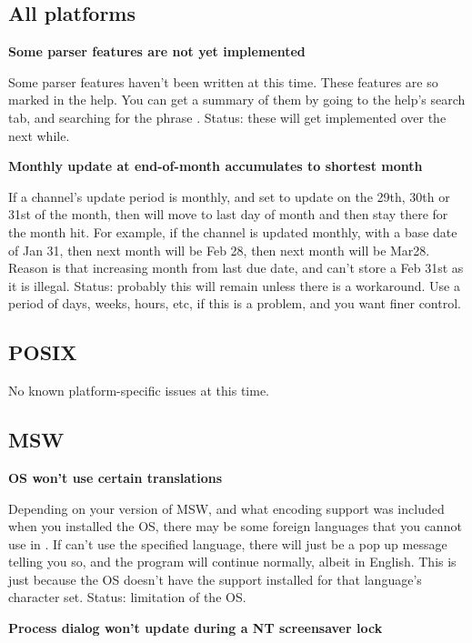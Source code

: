 \begin{helponly}
\subsection{All platforms}\label{pd-known-issues-all-platforms}

\bf{Some parser features are not yet implemented}

Some parser features haven't been written at this time. These features are so marked
in the \brandingapplicationdesktopname help. You can get a summary of them by going to the help's
search tab, and searching for the phrase . Status:
these will get implemented over the next while.

\bf{Monthly update at end-of-month accumulates to shortest month}

If a channel's update period is monthly, and set to update on the 29th, 30th or 31st
of the month, then will move to last day of month and then stay there for the
month hit. For example, if the channel is updated monthly, with a
base date of Jan 31, then next month will be Feb 28, then next month will be Mar28.
Reason is that increasing month from last due date, and can't store a Feb 31st as it
is illegal. Status: probably this will remain unless there is a workaround. Use
a period of days, weeks, hours, etc, if this is a problem, and you want finer control.

\subsection{POSIX}

No known platform-specific issues at this time.

\subsection{MSW}

\bf{OS won't use certain translations}

Depending on your version of MSW, and what encoding support was included when
you installed the OS, there may be some foreign languages that you cannot use
in \brandingapplicationdesktopname. If \brandingapplicationdesktopname can't use the specified language,
there will just be a pop up message telling you so, and the program will
continue normally, albeit in English.
This is just because the OS doesn't have the support installed for that
language's character set. Status: limitation of the OS.

\bf{Process dialog won't update during a NT screensaver lock}


\end{helponly}
